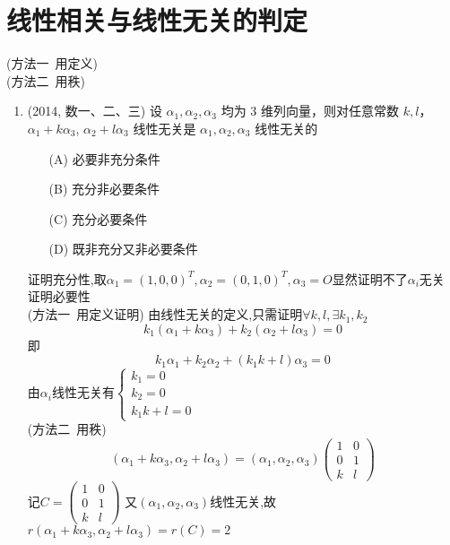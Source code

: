 \documentclass[12pt, a4paper, oneside, UTF8]{ctexbook}
\begin{document}
\section{线性相关与线性无关的判定}
\begin{remark}[相关/无关的判定]
    (方法一\ 用定义) \\
    (方法二\ 用秩)
\end{remark}
\begin{enumerate}
    \item (2014, 数一、二、三) 设 $\alpha_1, \alpha_2, \alpha_3$ 均为 3 维列向量，则对任意常数 $k, l$，$\alpha_1 + k\alpha_3$, $\alpha_2 + l\alpha_3$ 线性无关是 $\alpha_1, \alpha_2, \alpha_3$ 线性无关的
    \begin{enumerate}
        \item [(A)] 必要非充分条件
        \item [(B)] 充分非必要条件
        \item [(C)] 充分必要条件
        \item [(D)] 既非充分又非必要条件
    \end{enumerate}
    
    \begin{solution}
    证明充分性,取$\alpha_1=(1,0,0)^T,\alpha_2=(0,1,0)^T,\alpha_3=O$显然证明不了$\alpha_i$无关 \\
    证明必要性 \\
    (方法一\ 用定义证明) 
    由线性无关的定义,只需证明$\forall k,l,\exists k_1,k_2$
    $$
    k_1(\alpha_1+k\alpha_3)+k_2(\alpha_2+l\alpha_3) = 0
    $$
    即
    $$
    k_1\alpha_1 + k_2\alpha_2 + (k_1k+l)\alpha_3 = 0
    $$
    由$\alpha_i$线性无关有$\begin{cases}
        k_1 = 0 \\
        k_2 = 0 \\
        k_1k+l = 0
    \end{cases}$ \\
    (方法二\ 用秩)
    $$
    (\alpha_1+k\alpha_3,\alpha_2+l\alpha_3) = (\alpha_1,\alpha_2,\alpha_3)\begin{pmatrix}
        1 & 0 \\
        0 & 1 \\
        k & l 
    \end{pmatrix}
    $$
    记$C=\begin{pmatrix}
        1 & 0 \\
        0 & 1 \\
        k & l 
    \end{pmatrix}$
    又$(\alpha_1,\alpha_2,\alpha_3)$线性无关,故$r(\alpha_1+k\alpha_3,\alpha_2+l\alpha_3)=r(C)=2$
    \end{solution}
    

\end{enumerate}
\end{document}
